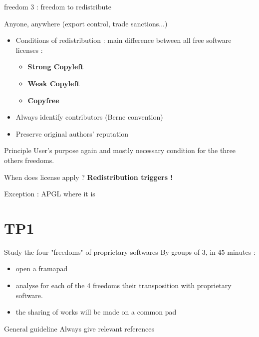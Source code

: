 \documentclass{beamer}
\begin{document}
\begin{frame}{freedom 3 : freedom to redistribute}

Anyone, anywhere (export control, trade sanctions...)

  \begin{itemize}
  \item Conditions of redistribution : main difference between all free software licenses :
    \begin{itemize}
    \item \textbf{Strong Copyleft}
    \item \textbf{Weak Copyleft}
    \item \textbf{Copyfree}
    \end{itemize}
  \item Always identify contributors (Berne convention)
  \item Preserve original authors' reputation
  \end{itemize}
\begin{alertblock}{Principle}
    User's purpose again and mostly necessary condition for the three others freedoms.
  \end{alertblock}

\begin{alertblock}{When does license apply ?}
\textbf{Redistribution triggers !}
 \end{alertblock}
 
 Exception : APGL where it is 
\end{frame}

\section{TP1}

\begin{frame}{Study the four "freedoms" of proprietary softwares}
  By groups of 3, in 45 minutes :
  \begin{itemize}
  \item open a framapad
  \item analyse for each of the 4 freedoms their transposition with proprietary software.
  \item the sharing of works will be made on a common pad
  \end{itemize}

  \begin{alertblock}{General guideline}
	Always give relevant references 
  \end{alertblock}
\end{frame}
\end{document}
